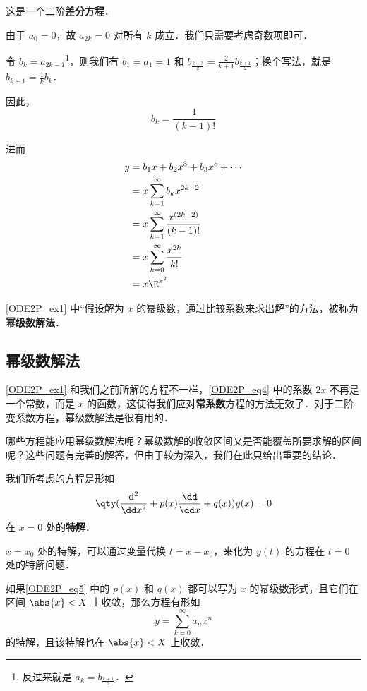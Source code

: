 \begin{example}{}
这是一个二阶\textbf{差分方程}．

由于 $a_0=0$，故 $a_{2k}=0$ 对所有 $k$ 成立．我们只需要考虑奇数项即可．

令 $b_k=a_{2k-1}$\footnote{反过来就是 $a_k=b_{\frac{k+1}{2}}$．}，则我们有 $b_1=a_1=1$ 和 $b_{\frac{k+3}{2}}=\frac{2}{k+1}b_{\frac{k+1}{2}}$；换个写法，就是 $b_{k+1}=\frac{1}{k}b_k$．

因此，
\begin{equation}
b_k=\frac{1}{(k-1)!}
\end{equation}

进而
\begin{equation}\label{ODE2P_eq6}
\begin{aligned}
y&=b_1x+b_2x^3+b_3x^5+\cdots\\
 &=x\sum\limits_{k=1}^\infty b_kx^{2k-2}\\
 &=x\sum\limits_{k=1}^\infty \frac{x^{(2k-2)}}{(k-1)!}\\
 &=x\sum\limits_{k=0}^\infty \frac{x^{2k}}{k!}\\
 &=x\E^{x^2} 
\end{aligned}
\end{equation}

\end{example}

\autoref{ODE2P_ex1} 中“假设解为 $x$ 的幂级数，通过比较系数来求出解”的方法，被称为\textbf{幂级数解法}．


\subsection{幂级数解法}

\autoref{ODE2P_ex1} 和我们之前所解的方程不一样，\autoref{ODE2P_eq4} 中的系数 $2x$ 不再是一个常数，而是 $x$ 的函数，这使得我们应对\textbf{常系数}方程的方法无效了．对于二阶变系数方程，幂级数解法是很有用的．

哪些方程能应用幂级数解法呢？幂级数解的收敛区间又是否能覆盖所要求解的区间呢？这些问题有完善的解答，但由于较为深入，我们在此只给出重要的结论．

我们所考虑的方程是形如
\begin{equation}\label{ODE2P_eq5}
\qty(\frac{\mathrm{d}^2}{\dd x^2}+p(x)\frac{\dd}{\dd x}+q(x))y(x)=0
\end{equation}
在 $x=0$ 处的\textbf{特解}．

$x=x_0$ 处的特解，可以通过变量代换 $t=x-x_0$，来化为 $y(t)$ 的方程在 $t=0$ 处的特解问题．

\begin{theorem}{}\label{ODE2P_the2}
如果\autoref{ODE2P_eq5} 中的 $p(x)$ 和 $q(x)$ 都可以写为 $x$ 的幂级数形式，且它们在区间 $\abs{x}<X$ 上收敛，那么方程有形如
\begin{equation}
y=\sum\limits_{k=0}^\infty a_nx^n
\end{equation}
的特解，且该特解也在 $\abs{x}<X$ 上收敛．
\end{theorem}

